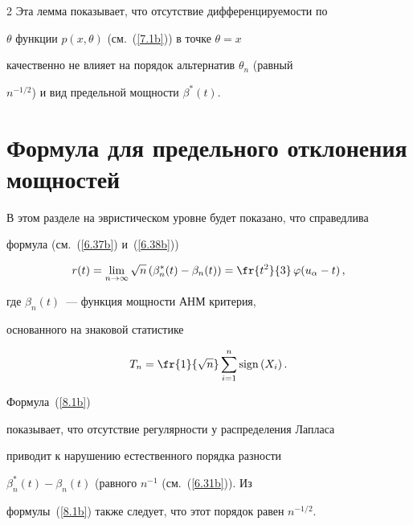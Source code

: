 \begin{multicols}{2}
Эта лемма показывает, что отсутствие дифференцируемости по


$\theta$ функции $p(x, \theta)$ (см.~(\ref{7.1b})) в точке $\theta=x$


качественно не влияет на порядок альтернатив $\theta_n$ (равный


$n^{-1/2}$) и вид предельной мощности $\beta^*(t)$.





\section{Формула для предельного отклонения мощностей}





В этом разделе на эвристическом уровне будет показано, что справедлива


формула (см.~(\ref{6.37b}) и~(\ref{6.38b}))


\begin{equation}


r(t)=\lim_{n \to \infty}


{\sqrt {n}\,(\beta_n^*(t)-\beta_n(t))}=\fr{t^2}{3}\,\varphi(u_\alpha-t)\,,


\label{8.1b}


\end{equation}


где $\beta_n(t)$~--- функция мощности АНМ критерия,


основанного на знаковой статистике


\begin{equation}


T_n=\fr{1}{\sqrt


n}\sum \limits_{i=1}^n{\mathrm{sign}\left ( X_i\right )}\,.


\label{8.2b}


\end{equation}


Формула~(\ref{8.1b})


показывает, что отсутствие регулярности у распределения Лапласа


приводит к нарушению естественного порядка разности


$\beta_n^*(t)-\beta_n(t)$ (равного $n^{-1}$ (см.~(\ref{6.31b})). Из


формулы~(\ref{8.1b}) также следует, что этот порядок равен $n^{-1/2}$.






\end{multicols}
